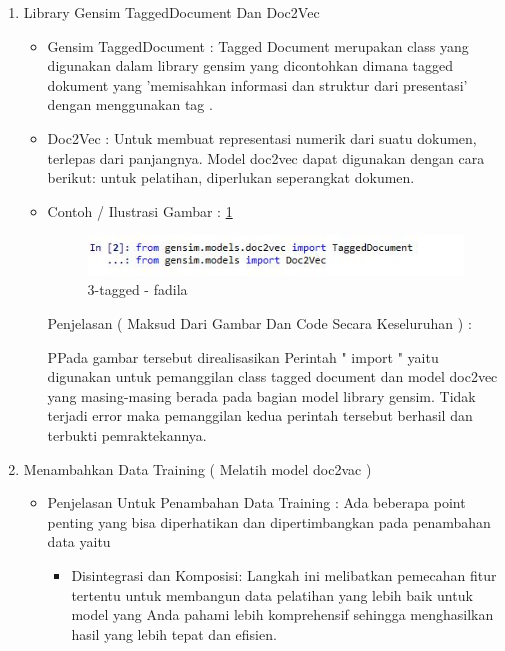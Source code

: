\begin{enumerate}
\par
\par
\par
\item Library Gensim TaggedDocument Dan Doc2Vec
\begin{itemize}
\item Gensim TaggedDocument : Tagged Document merupakan class yang digunakan dalam library gensim yang dicontohkan dimana tagged dokument yang 'memisahkan informasi dan struktur dari presentasi' dengan menggunakan tag .
\item Doc2Vec : Untuk membuat representasi numerik dari suatu dokumen, terlepas dari panjangnya. Model doc2vec dapat digunakan dengan cara berikut: untuk pelatihan, diperlukan seperangkat dokumen.
\item Contoh / Ilustrasi Gambar : \ref{3-tagged - fadila}
\par
\begin{figure}[!hbtp]
\centering
\includegraphics[scale=0.3]{figures/3-tagged-fadila.jpg}
\caption{3-tagged - fadila}
\label{3-tagged - fadila}
\end{figure}
\par
\par Penjelasan ( Maksud Dari Gambar Dan Code Secara Keseluruhan ) : 
\par PPada gambar tersebut direalisasikan Perintah " import " yaitu digunakan untuk pemanggilan class tagged document dan model doc2vec yang masing-masing berada pada bagian model library gensim. Tidak terjadi error maka pemanggilan kedua perintah tersebut berhasil dan terbukti pemraktekannya.
\par
\end{itemize}
\item Menambahkan Data Training ( Melatih model doc2vac )
\begin{itemize}
\item Penjelasan Untuk Penambahan Data Training : Ada beberapa point penting yang bisa diperhatikan dan dipertimbangkan pada penambahan data yaitu
\begin{itemize}
\item Disintegrasi dan Komposisi: Langkah ini melibatkan pemecahan fitur tertentu untuk membangun data pelatihan yang lebih baik untuk model yang Anda pahami lebih komprehensif sehingga menghasilkan hasil yang lebih tepat dan efisien.

\end{itemize}
\end{itemize}
\end{enumerate}
